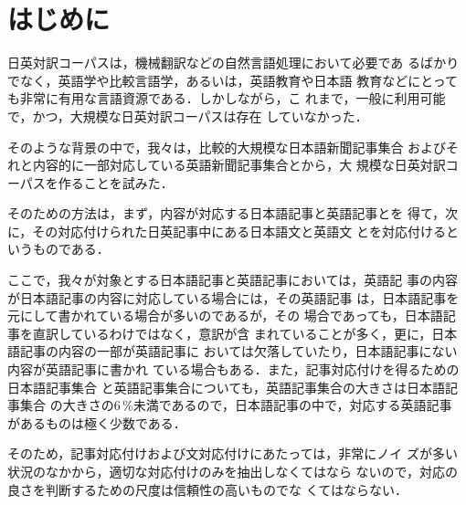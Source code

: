 


\maketitle
\thispagestyle{empty}




















\section{はじめに}
\label{sec:intro}

日英対訳コーパスは，機械翻訳などの自然言語処理において必要であ
るばかりでなく，英語学や比較言語学，あるいは，英語教育や日本語
教育などにとっても非常に有用な言語資源である．しかしながら，こ
れまで，一般に利用可能で，かつ，大規模な日英対訳コーパスは存在
していなかった．

そのような背景の中で，我々は，比較的大規模な日本語新聞記事集合
およびそれと内容的に一部対応している英語新聞記事集合とから，大
規模な日英対訳コーパスを作ることを試みた．

そのための方法は，まず，内容が対応する日本語記事と英語記事とを
得て，次に，その対応付けられた日英記事中にある日本語文と英語文
とを対応付けるというものである．

ここで，我々が対象とする日本語記事と英語記事においては，英語記
事の内容が日本語記事の内容に対応している場合には，その英語記事
は，日本語記事を元にして書かれている場合が多いのであるが，その
場合であっても，日本語記事を直訳しているわけではなく，意訳が含
まれていることが多く，更に，日本語記事の内容の一部が英語記事に
おいては欠落していたり，日本語記事にない内容が英語記事に書かれ
ている場合もある．また，記事対応付けを得るための日本語記事集合
と英語記事集合についても，英語記事集合の大きさは日本語記事集合
の大きさの6\,\%未満であるので，日本語記事の中で，対応する英語記事
があるものは極く少数である．

そのため，記事対応付けおよび文対応付けにあたっては，非常にノイ
ズが多い状況のなかから，適切な対応付けのみを抽出しなくてはなら
ないので，対応の良さを判断するための尺度は信頼性の高いものでな
くてはならない．

